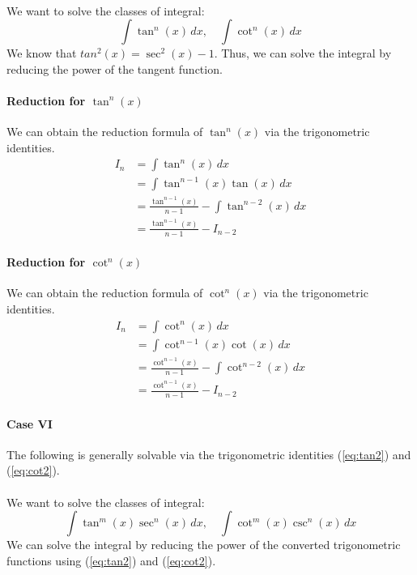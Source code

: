 \documentclass[11pt]{report}
\begin{document}
\paragraph{} We want to solve the classes of integral:
\begin{equation}
    \int \tan^n(x) \, dx, \quad \int \cot^n(x) \, dx 
\end{equation}
We know that $tan^2(x) = \sec^2(x) - 1$. Thus, we can solve the integral by reducing the power of the tangent function.
\paragraph{Reduction for $\tan^n(x)$} We can obtain the reduction formula of $\tan^n(x)$ via the trigonometric identities.
\begin{align}
    I_n &= \int \tan^n(x) \, dx \nonumber \\
    &= \int \tan^{n-1}(x) \tan(x) \, dx \nonumber \\
    &= \frac{\tan^{n-1}(x)}{n-1} - \int \tan^{n-2}(x) \, dx \nonumber \\
    &= \frac{\tan^{n-1}(x)}{n-1} - I_{n-2}
\end{align}
\paragraph{Reduction for $\cot^n(x)$} We can obtain the reduction formula of $\cot^n(x)$ via the trigonometric identities.
\begin{align}
    I_n &= \int \cot^n(x) \, dx \nonumber \\
    &= \int \cot^{n-1}(x) \cot(x) \, dx \nonumber \\
    &= \frac{\cot^{n-1}(x)}{n-1} - \int \cot^{n-2}(x) \, dx \nonumber \\
    &= \frac{\cot^{n-1}(x)}{n-1} - I_{n-2}
\end{align}
\paragraph{Case VI} The following is generally solvable via the trigonometric identities (\ref{eq:tan2}) and (\ref{eq:cot2}).
\paragraph{} We want to solve the classes of integral:
\begin{equation} 
    \int \tan^m(x) \sec^n(x) \, dx, \quad \int \cot^m(x) \csc^n(x) \, dx 
\end{equation}
We can solve the integral by reducing the power of the converted trigonometric functions using (\ref{eq:tan2}) and (\ref{eq:cot2}).
\end{document}
